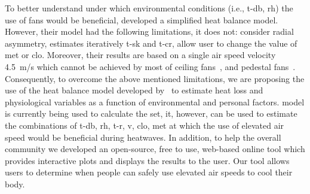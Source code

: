 To better understand under which environmental conditions (i.e., \ac{t-db}, \ac{rh}) the use of fans would be beneficial,  developed a simplified heat balance model.
However, their model had the following limitations, it does not: consider radial asymmetry, estimates iteratively \ac{t-sk} and \ac{t-cr}, allow user to change the value of \ac{met} or \ac{clo}.
Moreover, their results are based on a single air speed velocity 4.5~m/s which cannot be achieved by most of ceiling fans~\cite{Raftery2019}, and pedestal fans~\cite{Yang2015a}.
Consequently, to overcome the above mentioned limitations, we are proposing the use of the heat balance model developed by~ to estimate heat loss and physiological variables as a function of environmental and personal factors.
 model is currently being used to calculate the \ac{set}, it, however, can be used to estimate the combinations of \ac{t-db}, \ac{rh}, \ac{t-r}, \ac{v}, \ac{clo}, \ac{met} at which the use of elevated air speed would be beneficial during heatwaves.
In addition, to help the overall community we developed an open-source, free to use, web-based online tool which provides interactive plots and displays the results to the user.
Our tool allows users to determine when people can safely use elevated air speeds to cool their body.

